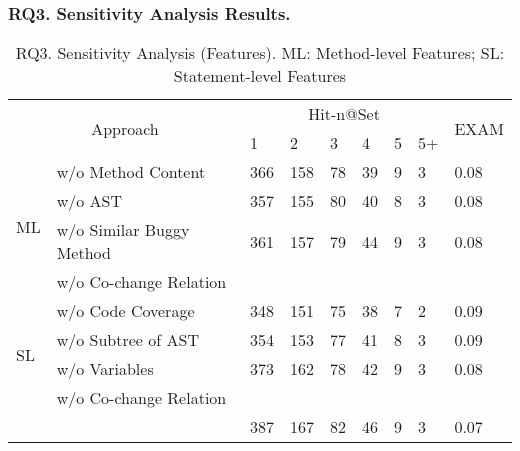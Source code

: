 \subsubsection{\bf RQ3. Sensitivity Analysis Results.}



\begin{table}[t]
	\caption{RQ3. Sensitivity Analysis (Features). ML: Method-level Features; SL: Statement-level Features}
	{\small
		\begin{center}
			\renewcommand{\arraystretch}{1}
			\begin{tabular}{p{0.3cm}<{\centering}|p{3cm}|p{0.3cm}<{\centering}|p{0.3cm}<{\centering}|p{0.2cm}<{\centering}|p{0.2cm}<{\centering}|p{0.15cm}<{\centering}|p{0.15cm}<{\centering}|p{0.7cm}<{\centering}}
				\hline
				\multicolumn{2}{c|}{\multirow{2}{*}{Approach}}    & \multicolumn{6}{c|}{Hit-n@Set}& \multirow{2}{*}{EXAM}\\
				\cline{3-8}
				                 \multicolumn{2}{c|}{}   &1&2&3&4&5&5+&\\
				
				\hline 
				\multirow{4}{*}{ML}&w/o Method Content              & 366 & 158 & 78  & 39 & 9 & 3   & 0.08\\
				&w/o	AST	                        & 357 & 155 & 80  & 40 & 8 & 3   & 0.08\\
				&w/o Similar Buggy Method    	& 361 & 157 & 79  & 44 & 9 & 3   & 0.08\\
				&w/o Co-change Relation          &  &  &   &  &  &    & \\
				\hline
				\multirow{4}{*}{SL}&w/o Code Coverage               & 348 & 151 & 75  & 38 & 7 & 2   & 0.09\\
				&w/o	Subtree of AST  	        & 354 & 153 & 77  & 41 & 8 & 3   & 0.09\\
				&w/o Variables               	& 373 & 162 & 78  & 42 & 9 & 3   & 0.08\\
				&w/o Co-change Relation          &  &  &   &  &  &    & \\
				\hline
			&	\tool                           & 387 & 167 & 82  & 46 & 9 & 3   & 0.07\\
				\hline
			\end{tabular}
			
			\label{fig:rq3-1}
		\end{center}
	}
\end{table}

